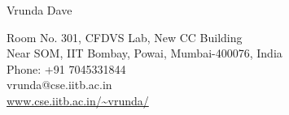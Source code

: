 \documentclass{resume} %
\newcommand{\MyName}[1]{ %
	\Huge %
	\hflil #1
	\par \normalsize \normalfont}
\newcommand{\MySlogan}[1]{ %
	\large %
	\hfill \text{#1}
	\par \normalsize \normalfont}
\begin{document}
	\begin{flushright}{\Huge \hfill
			Vrunda Dave 
		\par  \normalsize \normalfont}
	\end{flushright}
	\begin{flushright}{\large \hfill
			Room No. 301, CFDVS Lab, New CC Building \\ Near SOM, IIT Bombay, Powai, Mumbai-400076, India\\ Phone: +91 7045331844 \\ vrunda@cse.iitb.ac.in \\ \url{www.cse.iitb.ac.in/~vrunda/}
		\par  \normalsize \normalfont}
\end{flushright}
			
	
%
%		
%	
\end{document}
